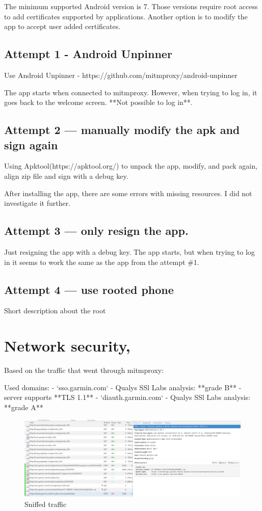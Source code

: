 The minimum supported Android version is 7.
Those versions require root access to add certificates supported by applications.
Another option is to modify the app to accept user added certificates.

\subsection*{Attempt 1 - Android Unpinner}
Use Android Unpinner - https://github.com/mitmproxy/android-unpinner

The app starts when connected to mitmproxy.
However, when trying to log in, it goes back to the welcome screen.
**Not possible to log in**.

\subsection*{Attempt 2 — manually modify the apk and sign again}

Using Apktool(https://apktool.org/) to unpack the app, modify, and pack again, align zip file and sign with a debug key.

After installing the app, there are some errors with missing resources.
I did not investigate it further.

\subsection*{Attempt 3 — only resign the app.}
Just resigning the app with a debug key.
The app starts, but when trying to log in it seems to work the same as the app from the attempt \#1.

\subsection*{Attempt 4 — use rooted phone}
Short description about the root

\section{Network security,}
Based on the traffic that went through mitmproxy:

Used domains:
- `sso.garmin.com` - Qualys SSl Labs analysis: **grade B**
- server supports **TLS 1.1**
- `diauth.garmin.com` - Qualys SSl Labs analysis: **grade A**

\begin{figure}[h]
    \centering
    \includegraphics[width=1\linewidth]{../../images/mitmproxy unpinner}
    \caption{Sniffed traffic}
    \label{fig:mitmproxy-unpinner}
\end{figure}

